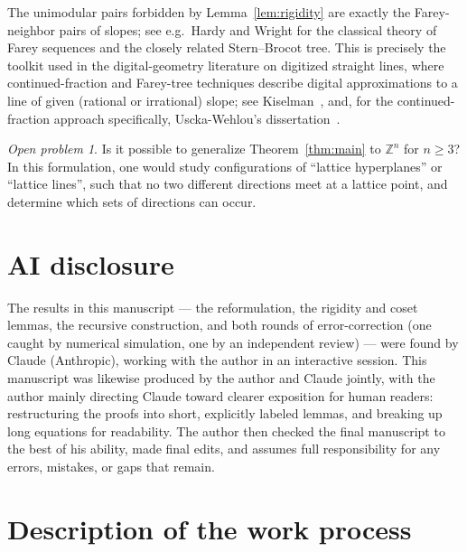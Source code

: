 \documentclass[a4paper,11pt,oneside,reqno]{amsart}
\theoremstyle{definition}
\theoremstyle{remark}
\newtheorem{openproblem}[definition]{Open problem}
\theoremstyle{plain}
\newcommand{\Z}{\mathbb{Z}}
\begin{document}
The unimodular pairs forbidden by Lemma~\ref{lem:rigidity} are exactly the Farey-neighbor pairs of
slopes; see e.g.\ Hardy and Wright \cite[Ch.~III]{HardyWright2008} for the classical theory of
Farey sequences and the closely related Stern--Brocot tree. This is precisely the toolkit used in
the digital-geometry literature on digitized straight lines, where continued-fraction and
Farey-tree techniques describe digital approximations to a line of given (rational or irrational)
slope; see Kiselman~\cite{Kiselman2022}, and, for the continued-fraction approach specifically,
Uscka-Wehlou's dissertation~\cite{UsckaWehlou2009}.

\begin{openproblem}
  Is it possible to generalize Theorem~\ref{thm:main} to \(\Z^n\) for \(n\ge3\)? In this formulation,
  one would study configurations of ``lattice hyperplanes'' or ``lattice lines'', such that no two
  different directions meet at a lattice point, and determine which sets of directions can occur.
\end{openproblem}

\section*{AI disclosure}

The results in this manuscript --- the reformulation, the rigidity and coset lemmas, the
recursive construction, and both rounds of error-correction (one caught by numerical simulation,
one by an independent review) --- were found by Claude (Anthropic), working with the author in an
interactive session. This manuscript was likewise produced by the author and Claude jointly, with
the author mainly directing Claude toward clearer exposition for human readers: restructuring the
proofs into short, explicitly labeled lemmas, and breaking up long equations for readability. The
author then checked the final manuscript to the best of his ability, made final edits, and assumes
full responsibility for any errors, mistakes, or gaps that remain.

\section*{Description of the work process}
\end{document}
